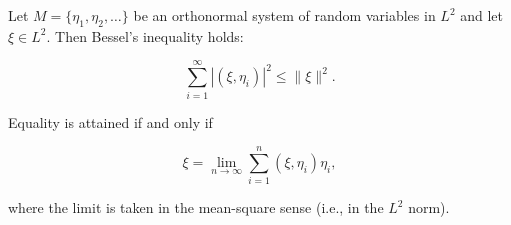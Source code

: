 Let $M = \{\eta_1, \eta_2, \ldots\}$ be an orthonormal system of random variables in $L^2$ and let $\xi \in L^2$. Then Bessel's inequality holds:

$$\sum_{i=1}^{\infty} |(\xi, \eta_i)|^2 \leq \|\xi\|^2.$$

Equality is attained if and only if

$$\xi = \lim_{n \to \infty} \sum_{i=1}^{n} (\xi, \eta_i) \eta_i,$$

where the limit is taken in the mean-square sense (i.e., in the $L^2$ norm).
